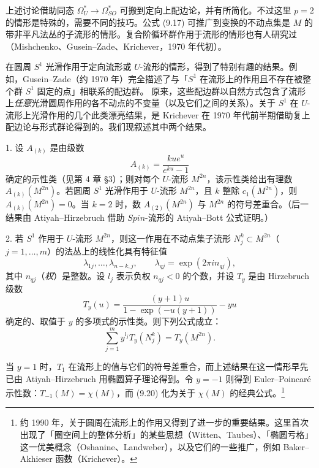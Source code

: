 上述讨论借助同态 $\Omega_U^*\to\Omega_{SO}^*$ 可搬到定向上配边论，并有所简化。不过这里 $p=2$ 的情形是特殊的，需要不同的技巧。公式 (9.17) 可推广到变换的不动点集是 $M$ 的带非平凡法丛的子流形的情形。复合阶循环群作用于流形的情形也有人研究过（Mishchenko、Gusein--Zade、Krichever，1970 年代初）。

在圆周 $S^1$ 光滑作用于定向流形或 $U$-流形的情形，得到了特别有趣的结果。例如，Gusein--Zade（约 1970 年）完全描述了与「$S^1$ 在流形上的作用且不存在被整个群 $S^1$ 固定的点」相联系的配边群。
原来，这些配边群以自然方式包含了流形上\emph{任意}光滑圆周作用的各不动点的不变量（以及它们之间的关系）。关于 $S^1$ 在 $U$-流形上光滑作用的几个此类漂亮结果，是 Krichever 在 1970 年代前半期借助复上配边论与形式群论得到的。我们现叙述其中两个结果。

1. 设 $A_{(k)}$ 是由级数
\[
A_{(k)}=\frac{kue^u}{e^{ku}-1}
\]
确定的示性类（见第 4 章 §3）；则对每个 $U$-流形 $M^{2n}$，该示性类给出有理数 $A_{(k)}(M^{2n})$。若圆周 $S^1$ 光滑作用于 $U$-流形 $M^{2n}$，且 $k$ 整除 $c_1(M^{2n})$，则 $A_{(k)}(M^{2n})=0$。当 $k=2$ 时，数 $A_{(2)}(M^{2n})$ 与 $M^{2n}$ 的符号差重合。（后一结果由 Atiyah--Hirzebruch 借助 $Spin$-流形的 Atiyah--Bott 公式证明。）

2. 若 $S^1$ 作用于 $U$-流形 $M^{2n}$，则这一作用在不动点集子流形 $N_j^k\subset M^{2n}$（$j=1,\ldots,m$）的法丛上的线性化具有特征值
\[
\lambda_{1j},\ldots,\lambda_{n-k,j},\qquad \lambda_{qj}=\exp(2\pi in_{qj}),
\]
其中 $n_{qj}$（\emph{权}）是整数。设 $l_j$ 表示负权 $n_{qj}<0$ 的个数，并设 $T_y$ 是由 Hirzebruch 级数
\[
T_y(u)=\frac{(y+1)u}{1-\exp(-u(y+1))}-yu
\]
确定的、取值于 $y$ 的多项式的示性类。则下列公式成立：
\begin{equation}
\sum_{j=1}^my^{l_j}T_y(N_j^k)=T_y(M^{2n}). \tag{9.20}
\end{equation}

当 $y=1$ 时，$T_1$ 在流形上的值与它们的符号差重合，而上述结果在这一情形早先已由 Atiyah--Hirzebruch 用椭圆算子理论得到。令 $y=-1$ 则得到 Euler--Poincaré 示性数：$T_{-1}(M)=\chi(M)$，而 (9.20) 化为关于 $\chi(M)$ 的经典公式。\footnote{约 1990 年，关于圆周在流形上的作用又得到了进一步的重要结果。这里首次出现了「圈空间上的整体分析」的某些思想（Witten、Taubes）、「椭圆亏格」这一优美概念（Oshanine、Landweber），以及它们的一些推广，例如 Baker--Akhieser 函数（Krichever）。}

